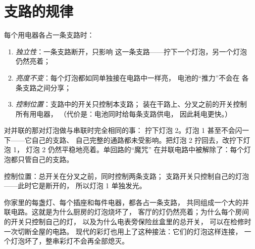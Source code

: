 \section{支路的规律}

\begin{proposition}[并联电路的规律]\label{prop:g5:series-parallel-circuits:rules}
每个用电器各占一条支路时：
\begin{enumerate}
  \item \emph{独立性}：一条支路断开，只影响
        这一条支路——拧下一个灯泡，另一个灯泡仍然亮着；
  \item \emph{亮度不变}：每个灯泡都如同单独接在电路中一样亮，
        电池的“推力”不会在
        各条支路之间分享；
  \item \emph{控制位置}：支路中的开关只控制本支路；
        装在干路上、分叉之前的开关控制所有用电器，
        （代价是：电池同时给每条支路供电，
        因此耗电更快。）
\end{enumerate}
\end{proposition}

\begin{example}[拧下灯泡的实验再做一次]\label{ex:g5:series-parallel-circuits:test}
对并联的那对灯泡做与串联时完全相同的事：
拧下灯泡 2。灯泡 1 甚至不会闪一下——它自己的支路、
自己完整的通路都未受影响。把灯泡 2 拧回去，改拧下灯泡 1，
灯泡 2 仍然平稳地亮着。单回路的“魔咒”
在并联电路中被解除了：每个灯泡都只管自己的支路。
\end{example}

\begin{omfigure}

{\small 控制位置：总开关在分叉之前，同时控制两条支路；
支路开关只控制自己的灯泡——此时它是断开的，
所以灯泡 1 单独发光。}
\end{omfigure}

\begin{example}[你家是一个并联电路]\label{ex:g5:series-parallel-circuits:house}
你家里的每盏灯、每个插座和每件电器，都各占一条支路，
共同组成一个大的并联电路。这就是为什么厨房的灯泡烧坏了，
客厅的灯仍然亮着；为什么每个房间的开关只控制自己的灯，
以及为什么电表旁保险丝盒里的总开关，
可以在检修时一次切断全屋的电路。
现代的彩灯也用上了这种接法：它们的灯泡这样连接，
一个灯泡坏了，整串彩灯不会再全部熄灭。
\end{example}

